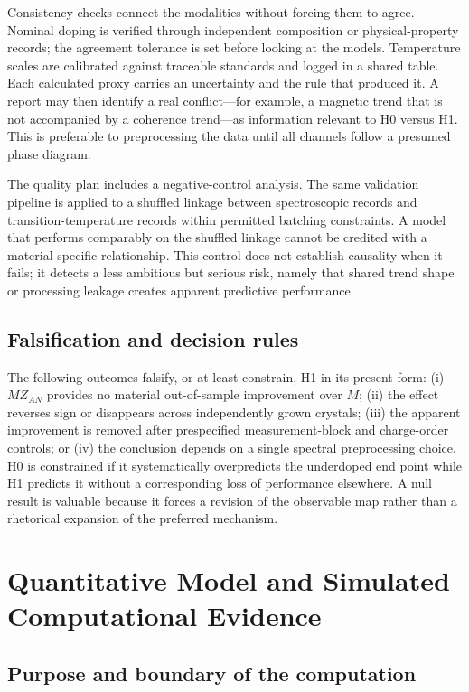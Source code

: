\documentclass[conference]{IEEEtran}
\begin{document}
Consistency checks connect the modalities without forcing them to agree. Nominal doping is verified through independent composition or physical-property records; the agreement tolerance is set before looking at the models. Temperature scales are calibrated against traceable standards and logged in a shared table. Each calculated proxy carries an uncertainty and the rule that produced it. A report may then identify a real conflict---for example, a magnetic trend that is not accompanied by a coherence trend---as information relevant to H0 versus H1. This is preferable to preprocessing the data until all channels follow a presumed phase diagram.

The quality plan includes a negative-control analysis. The same validation pipeline is applied to a shuffled linkage between spectroscopic records and transition-temperature records within permitted batching constraints. A model that performs comparably on the shuffled linkage cannot be credited with a material-specific relationship. This control does not establish causality when it fails; it detects a less ambitious but serious risk, namely that shared trend shape or processing leakage creates apparent predictive performance.

\subsection{Falsification and decision rules}

The following outcomes falsify, or at least constrain, H1 in its present form: (i) $MZ_{AN}$ provides no material out-of-sample improvement over $M$; (ii) the effect reverses sign or disappears across independently grown crystals; (iii) the apparent improvement is removed after prespecified measurement-block and charge-order controls; or (iv) the conclusion depends on a single spectral preprocessing choice. H0 is constrained if it systematically overpredicts the underdoped end point while H1 predicts it without a corresponding loss of performance elsewhere. A null result is valuable because it forces a revision of the observable map rather than a rhetorical expansion of the preferred mechanism.

\section{Quantitative Model and Simulated Computational Evidence}

\subsection{Purpose and boundary of the computation}
\end{document}

